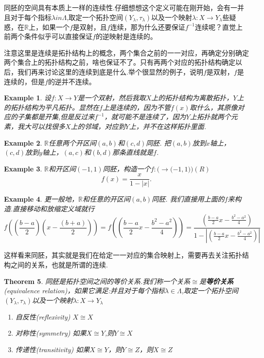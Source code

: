 \documentclass{article}
\newtheorem{theorem}{Theorem}[section]
\newtheorem{example}[theorem]{Example}
\newcommand*{\xfunc}[4]{{#2}\colon{#3}{#1}{#4}}
\newcommand*{\func}[3]{\xfunc{\to}{#1}{#2}{#3}}
\begin{document}
同胚的空间具有本质上一样的连续性.仔细想想这个定义可能在刚开始，会有一并且对于每个指标$\lambda in \Lambda$,取定一个拓扑空间$(Y_\lambda,\tau_\lambda)$以及一个映射$\func{\lambda}{X}{Y_\lambda}$些疑惑，在$\mathbb{R}$上，如果一个$f$是双射，且$f$连续，那为什么还要保证$f^{-1}$连续呢？直觉上前两个条件似乎可以直接保证$f$的逆映射是连续的。

注意这里是连续是拓扑结构上的概念，两个集合之前的一一对应，再确定分别确定两个集合上的拓扑结构之前，啥也保证不了。只有再两个对应的拓扑结构确定以后，我们再来讨论这里的连续到底是什么.举个很显然的例子，说明$f$是双射，$f$是连续的，但是$f$的逆并不连续。

\begin{example}
设$\func{f}{X}{Y}$是一个双射，然后我取$X$上的拓扑结构为离散拓扑，$Y$上的拓扑结构为平凡拓扑。显然在$f$上是连续的，因为不管$f(x)$取什么，其原像对应的子集都是开集,但是反过来$f^{-1}$，就可能不是连续了，因为$Y$上拓扑就两个元素，我大可以找很多$X$上的邻域，对应到$Y$上，并不在这样拓扑里面.
\end{example}

\begin{example}
$\mathbb{R}$任意两个开区间$(a,b)$和$(c,d)$同胚. 把$(a,b)$放到$x$轴上，$(c,d)$放到$y$轴上，$(a,c)$和$(b,d)$那条直线就是$f$. 
\end{example}

\begin{example}
$\mathbb{R}$和开区间$(-1,1)$同胚，构造一个$\func{f}((-1,1))(R)$\[f(x)=\frac{x}{1-|x|}.\]
\end{example}

\begin{example}
更一般地，$\mathbb{R}$和任意的开区间$(a,b)$同胚. 我们直接用上面的$f$来构造.直接移动和放缩定义域就行\[f((\frac{b-a}{2})(x-\frac{(b+a)}{2}))=f((\frac{b-a}{2}x-\frac{b^2-a^2}{4}))=\frac{(\frac{b-a}{2}x-\frac{b^2-a^2}{4})}{1-|(\frac{b-a}{2}x-\frac{b^2-a^2}{4})|}\]
\end{example}

这样看来同胚，其实就是我们在给定一一对应的集合映射上，需要再去关注拓扑结构之间的关系，也就是所谓的连续.

\begin{theorem}
同胚是拓扑空间之间的等价关系.我们称一个关系$\cong$是\textbf{等价关系}(equivalence relation)，如果它满足:并且对于每个指标$\lambda \in \Lambda$,取定一个拓扑空间$(Y_\lambda,\tau_\lambda)$以及一个映射$\func{\lambda}{X}{Y_\lambda}$
\begin{enumerate}
	\item 自反性(reflexivity) $X \cong X$
	\item 对称性(symmetry) 如果$X \cong Y$,则$Y \cong X$ 
	\item 传递性(transitivity) 如果$X \cong Y$，则$Y \cong Z$，则$X \cong Z$
\end{enumerate}
\end{theorem}
\end{document}
